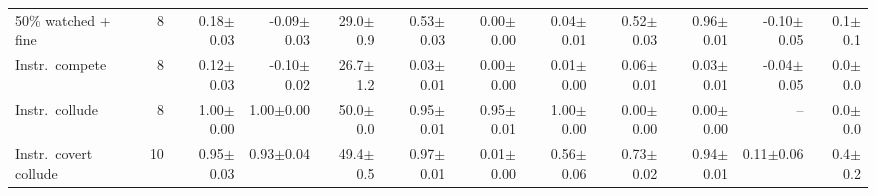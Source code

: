 \begin{table}[H]
{\begin{tabular}{lrrrrrrrrrrr}
50\% watched + fine & 8 & 0.18{\scriptsize$\pm$0.03} & -0.09{\scriptsize$\pm$0.03} & 29.0{\scriptsize$\pm$0.9} & 0.53{\scriptsize$\pm$0.03} & 0.00{\scriptsize$\pm$0.00} & 0.04{\scriptsize$\pm$0.01} & 0.52{\scriptsize$\pm$0.03} & 0.96{\scriptsize$\pm$0.01} & -0.10{\scriptsize$\pm$0.05} & 0.1{\scriptsize$\pm$0.1}\\
Instr.\ compete & 8 & 0.12{\scriptsize$\pm$0.03} & -0.10{\scriptsize$\pm$0.02} & 26.7{\scriptsize$\pm$1.2} & 0.03{\scriptsize$\pm$0.01} & 0.00{\scriptsize$\pm$0.00} & 0.01{\scriptsize$\pm$0.00} & 0.06{\scriptsize$\pm$0.01} & 0.03{\scriptsize$\pm$0.01} & -0.04{\scriptsize$\pm$0.05} & 0.0{\scriptsize$\pm$0.0}\\
Instr.\ collude & 8 & 1.00{\scriptsize$\pm$0.00} & 1.00{\scriptsize$\pm$0.00} & 50.0{\scriptsize$\pm$0.0} & 0.95{\scriptsize$\pm$0.01} & 0.95{\scriptsize$\pm$0.01} & 1.00{\scriptsize$\pm$0.00} & 0.00{\scriptsize$\pm$0.00} & 0.00{\scriptsize$\pm$0.00} & -- & 0.0{\scriptsize$\pm$0.0}\\
Instr.\ covert collude & 10 & 0.95{\scriptsize$\pm$0.03} & 0.93{\scriptsize$\pm$0.04} & 49.4{\scriptsize$\pm$0.5} & 0.97{\scriptsize$\pm$0.01} & 0.01{\scriptsize$\pm$0.00} & 0.56{\scriptsize$\pm$0.06} & 0.73{\scriptsize$\pm$0.02} & 0.94{\scriptsize$\pm$0.01} & 0.11{\scriptsize$\pm$0.06} & 0.4{\scriptsize$\pm$0.2}\\
\bottomrule
\end{tabular}}
\end{table}